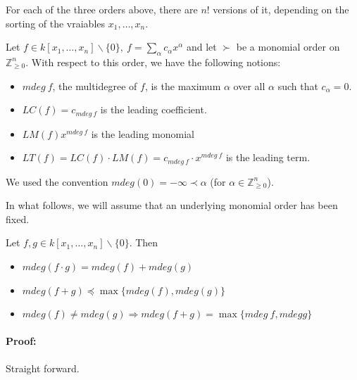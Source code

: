 \begin{remark}[title = Remark]
    For each of the three orders above, there are $n!$ versions of it, depending on the sorting of the vraiables $x_1, \ldots, x_n$. 
\end{remark}

\begin{definition}[title = Definition 2.1.7]
    Let $f \in k[x_1, \dots, x_n]\backslash\{0\}, \ f = \sum_{\alpha} c_{\alpha} x^{\alpha}$ and let $\succ$ be a monomial order on $\mathbb{Z}^n_{\geq 0}$. 
    With respect to this order, we have the following notions:
    
    \begin{itemize}
      \item[(i)] $mdeg\ f$, the multidegree of $f$, is the maximum $\alpha$ over all $\alpha$ such that $c_{\alpha} = 0$. 
      \item[(ii)] $LC(f) = c_{mdeg\ f}$ is the leading coefficient. 
      \item[(iii)] $LM(f)x^{mdeg\ f}$ is the leading monomial  
      \item[(iv)] $LT(f) = LC(f) \cdot LM(f) = c_{mdeg\ f} \cdot x^{mdeg\ f}$ is the leading term.
    \end{itemize}
    We used the convention $mdeg(0) = - \infty \prec \alpha$ (for $\alpha \in \mathbb{Z}^n_{\geq 0}$).
\end{definition}

In what follows, we will assume that an underlying monomial order has been fixed. 

\begin{lemma}[title = Lemma 2.1.8]
    Let $f, g \in k[x_1, \dots, x_n]\backslash\{0\}$. Then 
    \begin{itemize}
      \item[(i)] $mdeg (f \cdot g) = mdeg(f) + mdeg(g)$
      \item[(ii)] $mdeg (f + g) \preceq \max\{mdeg(f), mdeg(g)\}$
      \item[(iii)] $mdeg(f) \neq mdeg(g) \Rightarrow mdeg(f + g) = \max\{mdeg\ f, mdeg g \}$  
    \end{itemize} 

    \paragraph{Proof:} Straight forward. 
\end{lemma}
